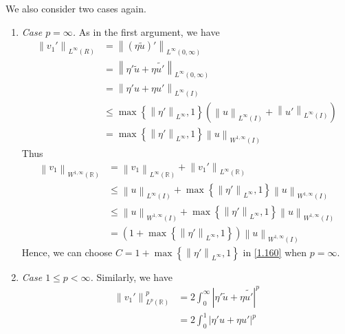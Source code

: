 \documentclass[a4paper,oneside]{book}
\numberwithin{equation}{chapter}
\begin{document}
We also consider two cases again.
\begin{enumerate}
\item \textit{Case $p=\infty$.} As in the first argument, we have
\begin{align}
{\left\| {{v_1}'} \right\|_{{L^\infty }\left( R \right)}} &= {\left\| {\left( {\eta \tilde u} \right)'} \right\|_{{L^\infty }\left( {0,\infty } \right)}}\\
 &= {\left\| {\eta '\tilde u + \eta \widetilde {u'}} \right\|_{{L^\infty }\left( {0,\infty } \right)}}\\
 &= {\left\| {\eta 'u + \eta u'} \right\|_{{L^\infty }\left( I \right)}}\\
 &\le \max \left\{ {{{\left\| {\eta '} \right\|}_{{L^\infty }}},1} \right\}\left( {{{\left\| u \right\|}_{{L^\infty }\left( I \right)}} + {{\left\| {u'} \right\|}_{{L^\infty }\left( I \right)}}} \right)\\
 &= \max \left\{ {{{\left\| {\eta '} \right\|}_{{L^\infty }}},1} \right\}{\left\| u \right\|_{{W^{1,\infty }}\left( I \right)}}
\end{align}
Thus
\begin{align}
{\left\| {{v_1}} \right\|_{{W^{1,\infty }}\left( \mathbb{R} \right)}} &= {\left\| {{v_1}} \right\|_{{L^\infty }\left( \mathbb{R} \right)}} + {\left\| {{v_1}'} \right\|_{{L^\infty }\left( \mathbb{R} \right)}}\\
& \le {\left\| u \right\|_{{L^\infty }\left( I \right)}} + \max \left\{ {{{\left\| {\eta '} \right\|}_{{L^\infty }}},1} \right\}{\left\| u \right\|_{{W^{1,\infty }}\left( I \right)}}\\
& \le {\left\| u \right\|_{{W^{1,\infty }}\left( I \right)}} + \max \left\{ {{{\left\| {\eta '} \right\|}_{{L^\infty }}},1} \right\}{\left\| u \right\|_{{W^{1,\infty }}\left( I \right)}}\\
& = \left( {1 + \max \left\{ {{{\left\| {\eta '} \right\|}_{{L^\infty }}},1} \right\}} \right){\left\| u \right\|_{{W^{1,\infty }}\left( I \right)}}
\end{align}
Hence, we can choose $C = 1 + \max \left\{ {{{\left\| {\eta '} \right\|}_{{L^\infty }}},1} \right\}$ in \eqref{1.160} when $p=\infty$.
\item \textit{Case $1\le p<\infty$.} Similarly, we have
\begin{align}
\left\| {{v_1}'} \right\|_{{L^p}\left( \mathbb{R} \right)}^p  &= 2\int_0^\infty  {{{\left| {\eta '\tilde u + \eta \widetilde {u'}} \right|}^p}} \\
& = 2\int_0^1 {{{\left| {\eta 'u + \eta u'} \right|}^p}} \\

\end{align}
\end{enumerate}
\end{document}
